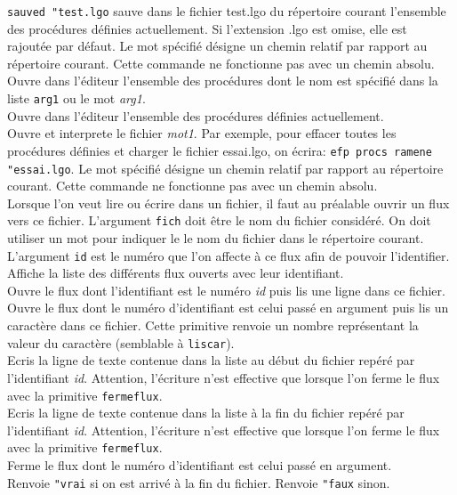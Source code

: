 \texttt{sauved "test.lgo} sauve dans le fichier test.lgo du répertoire courant l'ensemble des procédures définies actuellement. Si l'extension .lgo est omise, elle est rajoutée par défaut. Le mot spécifié désigne un chemin relatif par rapport au répertoire courant. Cette commande ne fonctionne pas avec un chemin absolu.\\
Ouvre dans l'éditeur l'ensemble des procédures dont le nom est spécifié dans la liste \texttt{arg1} ou le mot \textit{arg1}.\\
Ouvre dans l'éditeur l'ensemble des procédures définies actuellement.\\
Ouvre et interprete le fichier \textit{mot1}. Par exemple, pour effacer toutes les procédures définies et charger le fichier essai.lgo, on écrira: \texttt{efp procs ramene "essai.lgo}. Le mot spécifié désigne un chemin relatif par rapport au répertoire courant. Cette commande ne fonctionne pas avec un chemin absolu. \\
Lorsque l'on veut lire ou écrire dans un fichier, il faut au préalable ouvrir un flux vers ce fichier. L'argument \texttt{fich} doit être le nom du fichier considéré. On doit utiliser un mot pour indiquer le le nom du fichier dans le répertoire courant. L'argument \texttt{id} est le numéro que l'on affecte à ce flux afin de pouvoir l'identifier. \\
Affiche la liste des différents flux ouverts avec leur identifiant.\\
Ouvre le flux dont l'identifiant est le numéro \textit{id} puis lis une ligne dans ce fichier. \\
Ouvre le flux dont le numéro d'identifiant est celui passé en argument puis lis un caractère dans ce fichier. Cette primitive renvoie un nombre représentant la valeur du caractère (semblable à \texttt{liscar}).\\
Ecris la ligne de texte contenue dans la liste au début du fichier repéré par l'identifiant \textit{id}. Attention, l'écriture n'est effective que lorsque l'on ferme le flux avec la primitive \texttt{fermeflux}.\\
Ecris la ligne de texte contenue dans la liste à la fin du fichier repéré par l'identifiant \textit{id}. Attention, l'écriture n'est effective que lorsque l'on ferme le flux avec la primitive \texttt{fermeflux}.\\
Ferme le flux dont le numéro d'identifiant est celui passé en argument. \\
Renvoie \texttt{"vrai} si on est arrivé à la fin du fichier. Renvoie \texttt{"faux} sinon. \\ \\

